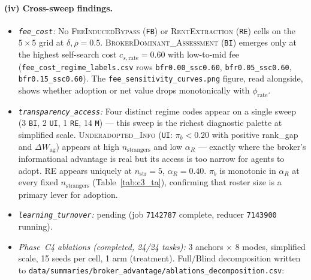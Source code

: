 \documentclass[11pt,a4paper]{article}
\begin{document}
\paragraph{(iv) Cross-sweep findings.}
\begin{itemize}[leftmargin=1.5em]
\item \emph{\texttt{fee\_cost}:} No \textsc{FeeInducedBypass} (\texttt{FB}) or \textsc{RentExtraction} (\texttt{RE}) cells on the $5\times 5$ grid at $\delta,\rho{=}0.5$. \textsc{BrokerDominant\_Assessment} (\texttt{BI}) emerges only at the highest self-search cost $c_{s,\text{rate}}{=}0.60$ with low-to-mid fee (\texttt{fee\_cost\_regime\_labels.csv} rows \texttt{bfr0.00\_ssc0.60}, \texttt{bfr0.05\_ssc0.60}, \texttt{bfr0.15\_ssc0.60}). The \texttt{fee\_sensitivity\_curves.png} figure, read alongside, shows whether adoption or net value drops monotonically with $\phi_{\text{rate}}$.
\item \emph{\texttt{transparency\_access}:} Four distinct regime codes appear on a single sweep (3 \texttt{BI}, 2 \texttt{UI}, 1 \texttt{RE}, 14 \texttt{M}) --- this sweep is the richest diagnostic palette at simplified scale. \textsc{Underadopted\_Info} (\texttt{UI}: $\pi_b<0.20$ with positive rank\_gap and $\Delta W_{\text{ag}}$) appears at high $n_{\text{strangers}}$ and low $\alpha_R$ --- exactly where the broker's informational advantage is real but its access is too narrow for agents to adopt. \textsc{RE} appears uniquely at $n_{\text{str}}{=}5$, $\alpha_R{=}0.40$. $\pi_b$ is monotonic in $\alpha_R$ at every fixed $n_{\text{strangers}}$ (Table~\ref{tab:c3_ta}), confirming that roster size is a primary lever for adoption.
\item \emph{\texttt{learning\_turnover}:} pending (job \texttt{7142787} complete, reducer \texttt{7143900} running).
\item \emph{Phase~C4 ablations (completed, 24/24 tasks):} 3 anchors $\times$ 8 modes, simplified scale, 15 seeds per cell, 1 arm (treatment). Full/Blind decomposition written to \texttt{data/summaries/broker\_advantage/ablations\_decomposition.csv}:
\begin{table}[h]\centering\small
\caption{Ablation full/blind decomposition at simplified scale (\texttt{ablations\_decomposition.csv}). ``Pooled data'' is the \textsc{BlindBroker} arm's gap (zero pair input, same pooled training). ``Pair input'' is $\text{Full}-\text{Blind}$.  Residualized-$R^2$ values at \texttt{self\_search} anchor ($\rho{=}1$) exceed $(-\infty,1]$ as flagged in §\ref{sec:c3}; \emph{we do not cite them here}.}

\end{table}
\end{itemize}
\end{document}
